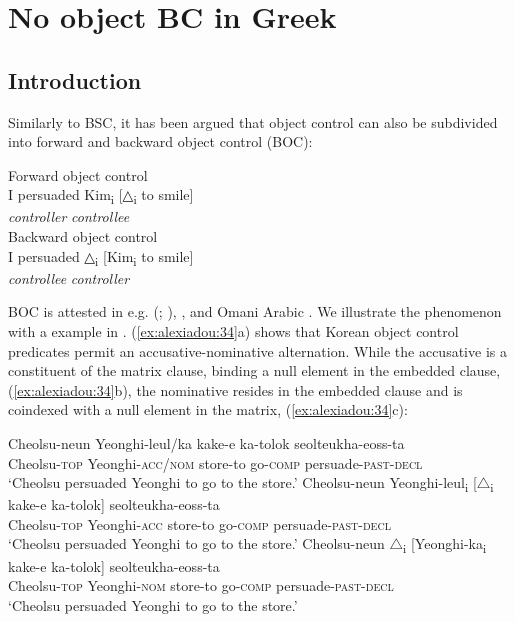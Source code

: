 \documentclass[output=paper]{langsci/langscibook}
\begin{document}
\section{No object BC in Greek} 

\subsection{Introduction}
Similarly to BSC, it has been argued that object control can also be subdivided into forward and backward object control (BOC):

\ea%
    \label{ex:alexiadou:33}
    \ea Forward object control\\
    \gll I persuaded   Kim\textsubscript{i}     [{△\textsubscript{i}} to smile]  \\
         {}   {}       \textit{controller}         \textit{controllee}\\
    \ex Backward object control\\
    \gll I persuaded  △\textsubscript{i}    [Kim\textsubscript{i}    to smile]  \\
        {}    {}       \textit{controllee}  \textit{controller}\\
        \z
\z

BOC is attested in e.g.  (\citealt{Potsdam2006Backward}; \citeyear{Potsdam2009}),  \citep{Monahan2003}, and Omani Arabic \citep{Al-Balushi2008}. We illustrate the phenomenon with a  example in . (\ref{ex:alexiadou:34}a) shows that Korean object control predicates permit an accusative-nominative alternation. While the accusative is a constituent of the matrix clause, binding a null element in the embedded clause, (\ref{ex:alexiadou:34}b), the nominative resides in the embedded clause and is coindexed with a null element in the matrix, (\ref{ex:alexiadou:34}c):
 
\ea%
    \label{ex:alexiadou:34} 
    \ea\gll Cheolsu-neun  Yeonghi-leul/ka     kake-e    ka-tolok   seolteukha-eoss-ta\\
            Cheolsu-\textsc{top}     Yeonghi-\textsc{acc/nom}   store-to  go-\textsc{comp}   persuade-\textsc{past-decl}\\
    \glt    ‘Cheolsu persuaded Yeonghi to go to the store.’
    \ex
    \gll Cheolsu-neun Yeonghi-leul\textsubscript{i} [${\bigtriangleup}$\textsubscript{i} kake-e     ka-tolok]  seolteukha-eoss-ta\\
             Cheolsu-\textsc{top}    Yeonghi-\textsc{acc}    {}      store-to   go-\textsc{comp}   persuade-\textsc{past-decl}\\
    \glt     ‘Cheolsu persuaded Yeonghi to go to the store.’     
    \ex
    \gll Cheolsu-neun ${\bigtriangleup}$\textsubscript{i} [Yeonghi-ka\textsubscript{i}    kake-e    ka-tolok]  seolteukha-eoss-ta\\
             Cheolsu-\textsc{top}  {}       Yeonghi-\textsc{nom}    store-to  go-\textsc{comp}      persuade-\textsc{past-decl}\\
    \glt     ‘Cheolsu persuaded Yeonghi to go to the store.’ 
    \z
\z {}
\end{document}
